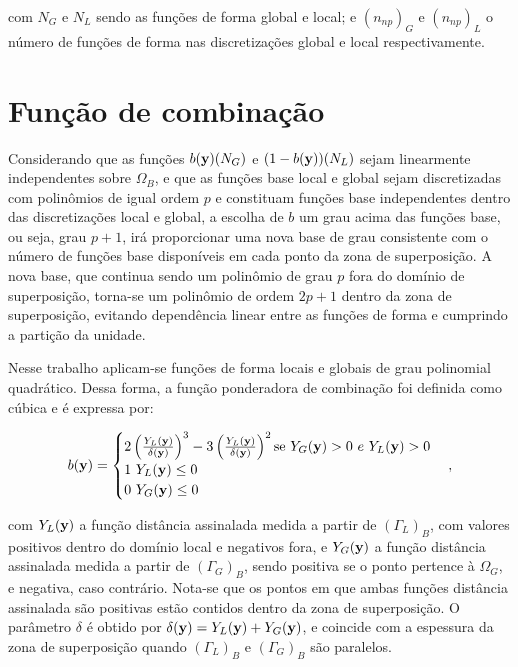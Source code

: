 \noindent com $N_{G}$ e $N_{L}$ sendo as funções de forma global e local; e $(n_{np})_G$ e $(n_{np})_L$ o número de funções de forma nas discretizações global e local respectivamente. 

\section{Função de combinação}

Considerando que as funções $b(\mathbf{y})(N_{G})$ e $(1-b(\mathbf{y}))(N_{L})$ sejam linearmente independentes sobre $\Omega_{B}$, e que as funções base local e global sejam discretizadas com polinômios de igual ordem $p$ e constituam funções base independentes dentro das discretizações local e global, a escolha de $b$ um grau acima das funções base, ou seja, grau $p+1$, irá proporcionar uma nova base de grau consistente com o número de funções base disponíveis em cada ponto da zona de superposição. A nova base, que continua sendo um polinômio de grau $p$ fora do domínio de superposição, torna-se um polinômio de ordem $2p+1$ dentro da zona de superposição, evitando dependência linear entre as funções de forma e cumprindo a partição da unidade.

Nesse trabalho aplicam-se funções de forma locais e globais de grau polinomial quadrático. Dessa forma, a função ponderadora de combinação foi definida como cúbica e é expressa por:

\begin{align}
	b(\mathbf{y}) =  \begin{cases} 2\left(\frac{Y_{L}(\mathbf{y})}{\delta(\mathbf{y})}\right)^3  -   3\left(\frac{Y_{L}(\mathbf{y})}{\delta(\mathbf{y})}\right)^2   \mbox{se } Y_{G}(\mathbf{y})> 0 \ e \ Y_{L}(\mathbf{y})> 0 \\
		1  \ Y_{L}(\mathbf{y}) \leq 0  \\
		0  \ Y_{G}(\mathbf{y}) \leq 0 \end{cases},
\end{align}

\noindent com $Y_{L}(\mathbf{y})$ a função distância assinalada medida a partir de $(\Gamma_{L})_{B}$, com valores positivos dentro do domínio local e negativos fora, e $Y_{G}(\mathbf{y})$ a função distância assinalada medida a partir de $(\Gamma_{G})_{B}$, sendo positiva se o ponto pertence à $\Omega_{G}$, e negativa, caso contrário. Nota-se que os pontos em que ambas funções distância assinalada são positivas estão contidos dentro da zona de superposição. O parâmetro $\delta$ é obtido por $\delta(\mathbf{y}) = Y_{L}(\mathbf{y}) + Y_{G}(\mathbf{y})$, e coincide com a espessura da zona de superposição quando $(\Gamma_{L})_{B}$ e $(\Gamma_{G})_{B}$ são paralelos.

